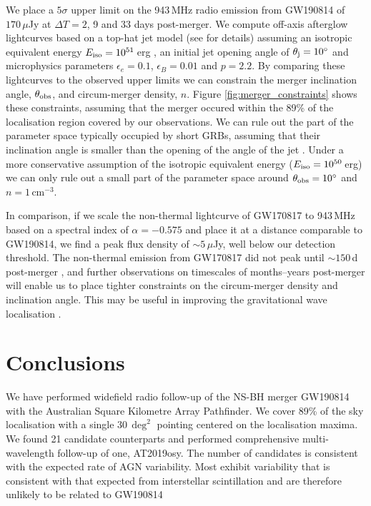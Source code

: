 We place a $5\sigma$ upper limit on the 943\,MHz radio emission from GW190814 of $170\,\mu$Jy at $\Delta T= 2$, 9 and 33 days post-merger. We compute off-axis afterglow lightcurves based on a top-hat jet model (see \citet{2015MNRAS.450.1430H} for details) assuming an isotropic equivalent energy $E_{\rm iso}=10^{51}$\,erg \citep[typical of short GRB afterglows;][]{2015ApJ...815..102F}, an initial jet opening angle of $\theta_{\rm j}=10\mbox{$^\circ$}$ and microphysics parameters $\epsilon_{e}=0.1$, $\epsilon_{B}=0.01$ and $p=2.2$. By comparing these lightcurves to the observed upper limits we can constrain the merger inclination angle, $\theta_{\rm obs}$, and circum-merger density, $n$. Figure \ref{fig:merger_constraints} shows these constraints, assuming that the merger occured within the 89\% of the localisation region covered by our observations. We can rule out the part of the parameter space typically occupied by short GRBs, assuming that their inclination angle is smaller than the opening of the angle of the jet \citep{2015ApJ...815..102F}. Under a more conservative assumption of the isotropic equivalent energy ($E_{\rm iso}=10^{50}$\,erg) we can only rule out a small part of the parameter space around $\theta_{\rm obs}=10\mbox{$^\circ$}$ and $n=1\,$cm$^{-3}$.

In comparison, if we scale the non-thermal lightcurve of GW170817 to 943\,MHz based on a spectral index of $\alpha=-0.575$ \citep{2018ApJ...868L..11M,2019ApJ...886L..17H} and place it at a distance comparable to GW190814, we find a peak flux density of $\sim 5\,\mu$Jy, well below our detection threshold. The non-thermal emission  from GW170817 did not peak until $\sim 150\,$d post-merger \citep{2018ApJ...858L..15D}, and further observations on timescales of months--years post-merger will enable us to place tighter constraints on the circum-merger density and inclination angle. This may be useful in improving the gravitational wave localisation \citep{2019MNRAS.488.4459C}.

\vspace{-5pt}
\section{Conclusions}
\vspace{-5pt}
We have performed widefield radio follow-up of the NS-BH merger GW190814 with the Australian Square Kilometre Array Pathfinder. We cover 89\% of the sky localisation with a single $30\,\deg^2$ pointing centered on the localisation maxima. We found 21 candidate counterparts and performed comprehensive multi-wavelength follow-up of one, AT2019osy. The number of candidates is consistent with the expected rate of AGN variability. Most exhibit variability that is consistent with that expected from interstellar scintillation and are therefore unlikely to be related to GW190814

